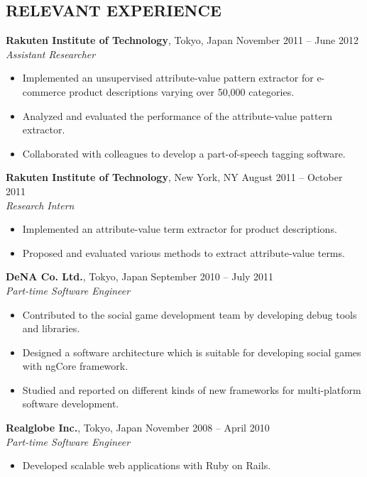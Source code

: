 \documentclass[10pt]{res}
\begin{document}
\begin{resume}
\section{\uppercase{Relevant Experience}}
\textbf{Rakuten Institute of Technology}, Tokyo, Japan \hfill November 2011 -- June 2012\\
\textit{Assistant Researcher}
\begin{itemize}
  \item Implemented an unsupervised attribute-value pattern extractor for e-commerce product descriptions varying over 50,000 categories.
  \item Analyzed and evaluated the performance of the attribute-value pattern extractor.
  \item Collaborated with colleagues to develop a part-of-speech tagging software.
\end{itemize}
\textbf{Rakuten Institute of Technology}, New York, NY \hfill August 2011 -- October 2011\\
\textit{Research Intern}
\begin{itemize}
  \item Implemented an attribute-value term extractor for product descriptions.
  \item Proposed and evaluated various methods to extract attribute-value terms.
\end{itemize}
\textbf{DeNA Co. Ltd.}, Tokyo, Japan \hfill September 2010 -- July 2011\\
\textit{Part-time Software Engineer}
\begin{itemize}
  \item Contributed to the social game development team by developing debug tools and libraries.
  \item Designed a software architecture which is suitable for developing social games with ngCore framework.
  \item Studied and reported on different kinds of new frameworks for multi-platform software development.
\end{itemize}
\textbf{Realglobe Inc.}, Tokyo, Japan \hfill November 2008 -- April 2010\\
\textit{Part-time Software Engineer}
\begin{itemize}
  \item Developed scalable web applications with Ruby on Rails.
\end{itemize}


\end{resume}
\end{document}
